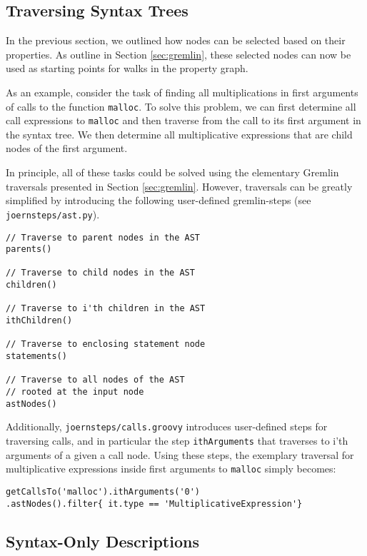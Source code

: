 \documentclass[a4paper]{article}
\newcommand{\code}[1]{\texttt{\small #1}}
\begin{document}

\subsection{Traversing Syntax Trees}
\label{sec:ast}

In the previous section, we outlined how nodes can be selected based
on their properties. As outline in Section \ref{sec:gremlin}, these
selected nodes can now be used as starting points for walks in the
property graph.

As an example, consider the task of finding all multiplications in
first arguments of calls to the function \code{malloc}. To solve this
problem, we can first determine all call expressions to \code{malloc}
and then traverse from the call to its first argument in the syntax
tree.  We then determine all multiplicative expressions that are child
nodes of the first argument.

In principle, all of these tasks could be solved using the elementary
Gremlin traversals presented in Section \ref{sec:gremlin}. However,
traversals can be greatly simplified by introducing the following
user-defined gremlin-steps (see \code{joernsteps/ast.py}).

\begin{verbatim}
// Traverse to parent nodes in the AST
parents()

// Traverse to child nodes in the AST
children()

// Traverse to i'th children in the AST
ithChildren()

// Traverse to enclosing statement node
statements()

// Traverse to all nodes of the AST
// rooted at the input node
astNodes()
\end{verbatim}
Additionally, \code{joernsteps/calls.groovy} introduces user-defined
steps for traversing calls, and in particular the step
\code{ithArguments} that traverses to i'th arguments of a given a call
node. Using these steps, the exemplary traversal for multiplicative 
expressions inside first arguments to \code{malloc} simply becomes:
\begin{verbatim}
getCallsTo('malloc').ithArguments('0')
.astNodes().filter{ it.type == 'MultiplicativeExpression'}
\end{verbatim}

\subsection{Syntax-Only Descriptions}
\label{sec:syntaxOnly}
\end{document}
